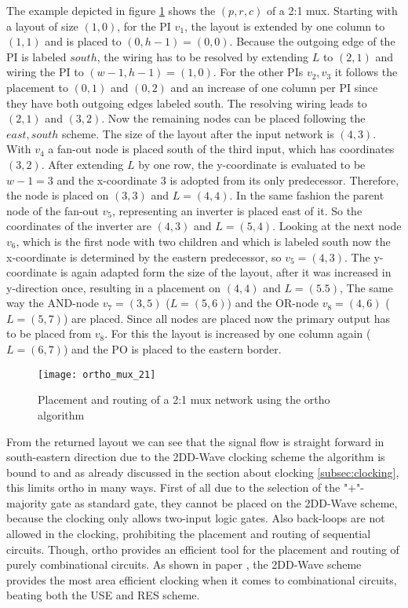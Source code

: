 The example depicted in figure \ref{fig:ortho_mux_21} shows the $(p, r, c)$ of a 2:1 mux. Starting with a layout of size $(1, 0)$, for the PI $v_1$, the layout is extended by one column to $(1, 1)$ and is placed to $(0, h-1) = (0, 0)$. Because the outgoing edge of the PI is labeled $south$, the wiring has to be resolved by extending $L$ to $(2, 1)$ and wiring the PI to $(w-1, h-1)=(1, 0)$. For the other PIs $v_2, v_3$ it follows the placement to $(0, 1)$ and $(0, 2)$ and an increase of one column per PI since they have both outgoing edges labeled south. The resolving wiring leads to $(2, 1)$ and $(3, 2)$. Now the remaining nodes can be placed following the $east, south$ scheme. The size of the layout after the input network is $(4, 3)$. With $v_4$ a fan-out node is placed south of the third input, which has coordinates $(3, 2)$. After extending $L$ by one row, the y-coordinate is evaluated to be $w-1 = 3$ and the x-coordinate $3$ is adopted from its only predecessor. Therefore, the node is placed on $(3, 3)$ and $L=(4, 4)$. In the same fashion the parent node of the fan-out $v_5$, representing an inverter is placed east of it. So the coordinates of the inverter are $(4, 3)$ and $L = (5, 4)$. Looking at the next node $v_6$, which is the first node with two children and which is labeled south now the x-coordinate is determined by the eastern predecessor, so $v_5 = (4, 3)$. The y-coordinate is again adapted form the size of the layout, after it was increased in y-direction once, resulting in a placement on $(4, 4)$ and $L = (5. 5)$, The same way the AND-node $v_7 = (3, 5)$ ($L = (5, 6)$) and the OR-node $v_8 = (4, 6)$ ($L = (5, 7)$) are placed. Since all nodes are placed now the primary output has to be placed from $v_8$. For this the layout is increased by one column again ($L = (6, 7)$) and the PO is placed to the eastern border.

\begin{figure}
	\centering
	\texttt{[image: ortho\_mux\_21]}
	\caption{Placement and routing of a 2:1 mux network using the ortho algorithm}\label{fig:ortho_mux_21}
\end{figure}

From the returned layout we can see that the signal flow is straight forward in south-eastern direction due to the 2DD-Wave clocking scheme the algorithm is bound to and as already discussed in the section about clocking \ref{subsec:clocking}, this limits ortho in many ways. First of all due to the selection of the "+"-majority gate as standard gate, they cannot be placed on the 2DD-Wave scheme, because the clocking only allows two-input logic gates. Also back-loops are not allowed in the clocking, prohibiting the placement and routing of sequential circuits. Though, ortho provides an efficient tool for the placement and routing of purely combinational circuits. As shown in paper \cite{walter2022exact}, the 2DD-Wave scheme provides the most area efficient clocking when it comes to combinational circuits, beating both the USE and RES scheme.

